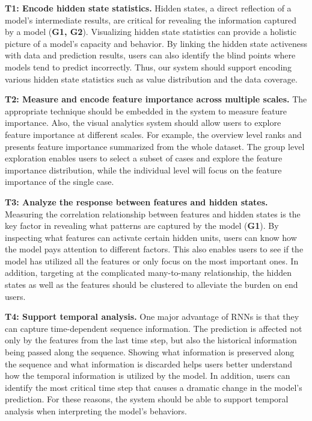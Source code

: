 \textbf{T1: Encode hidden state statistics.}
Hidden states, a direct reflection of a model's intermediate results, are critical for revealing the information captured by a model (\textbf{G1, G2}).
Visualizing hidden state statistics can provide a holistic picture of a model's capacity and behavior.
By linking the hidden state activeness with data and prediction results, users can also identify the blind points where models tend to predict incorrectly.
Thus, our system should support encoding various hidden state statistics such as value distribution and the data coverage.

\textbf{T2: Measure and encode feature importance across multiple scales.}
The appropriate technique should be embedded in the system to measure feature importance. 
Also, the visual analytics system should allow users to explore feature importance at different scales. 
For example, the overview level ranks and presents feature importance summarized from the whole dataset. 
The group level exploration enables users to select a subset of cases and explore the feature importance distribution, while the individual level will focus on the feature importance of the single case.


\textbf{T3: Analyze the response between features and hidden states.}
Measuring the correlation relationship between features and hidden states is the key factor in revealing what patterns are captured by the model (\textbf{G1}). 
By inspecting what features can activate certain hidden units, users can know how the model pays attention to different factors. 
This also enables users to see if the model has utilized all the features or only focus on the most important ones. 
In addition, targeting at the complicated many-to-many relationship, the hidden states as well as the features should be clustered to alleviate the burden on end users. 


\textbf{T4: Support temporal analysis.}
One major advantage of RNNs is that they can capture time-dependent sequence information.
The prediction is affected not only by the features from the last time step, but also the historical information being passed along the sequence.
Showing what information is preserved along the sequence and what information is discarded helps users better understand how the temporal information is utilized by the model.
In addition, users can identify the most critical time step that causes a dramatic change in the model's prediction.
For these reasons, the system should be able to support temporal analysis when interpreting the model's behaviors.


